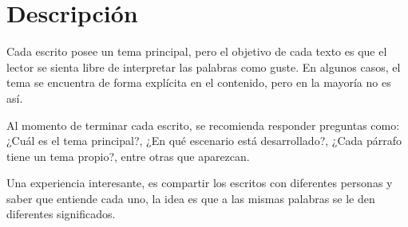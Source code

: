 \section*{Descripción}
\label{Descripcion}

\vspace{1em}
Cada escrito posee un tema principal, pero el objetivo de cada texto es que el lector se sienta libre de interpretar las palabras como guste. En algunos casos, el tema se encuentra de forma explícita en el contenido, pero en la mayoría no es así.

\vspace{1em}
Al momento de terminar cada escrito, se recomienda responder preguntas como: ¿Cuál es el tema principal?, ¿En qué escenario está desarrollado?, ¿Cada párrafo tiene un tema propio?, entre otras que aparezcan.

\vspace{1em}
Una experiencia interesante, es compartir los escritos con diferentes personas y saber que entiende cada uno, la idea es que a las mismas palabras se le den diferentes significados.







